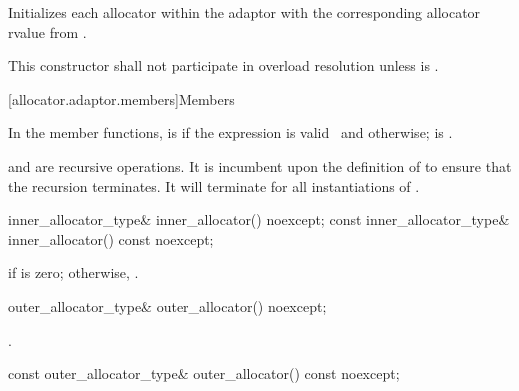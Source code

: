 \begin{itemdescr}
\pnum
\effects
Initializes each allocator within the adaptor with the corresponding allocator rvalue
from .

\pnum
\remarks
This constructor shall not participate in overload resolution unless
 is .
\end{itemdescr}

[allocator.adaptor.members]{Members}

\pnum
In the  member functions,
 is
 if
the expression  is
valid~ and
 otherwise;
 is
.
\begin{note}
 and
 are recursive operations. It
is incumbent upon the definition of  to ensure that the
recursion terminates. It will terminate for all instantiations of
.
\end{note}

%
\begin{itemdecl}
inner_allocator_type& inner_allocator() noexcept;
const inner_allocator_type& inner_allocator() const noexcept;
\end{itemdecl}

\begin{itemdescr}
\pnum
\returns
{} if  is zero; otherwise,
.
\end{itemdescr}

%
\begin{itemdecl}
outer_allocator_type& outer_allocator() noexcept;
\end{itemdecl}

\begin{itemdescr}
\pnum
\returns
{}.
\end{itemdescr}

%
\begin{itemdecl}
const outer_allocator_type& outer_allocator() const noexcept;
\end{itemdecl}

